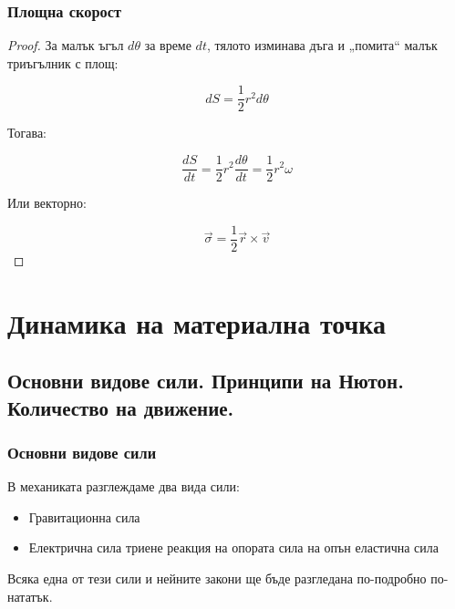 \documentclass{report}
\begin{document}
\subsection{Площна скорост}
\begin{proof}
	За малък ъгъл \( d\theta \) за време \( dt \), тялото изминава дъга и „помита“ малък триъгълник с площ:

\[
dS = \frac{1}{2} r^2 d\theta
\]

Тогава:

\[
\frac{dS}{dt} = \frac{1}{2} r^2 \frac{d\theta}{dt} = \frac{1}{2} r^2 \omega
\]

Или векторно:

\[
\vec{\sigma} = \frac{1}{2} \vec{r} \times \vec{v}
\]
\end{proof}




\chapter{Динамика на материална точка}

\section{Основни видове сили. Принципи на Нютон. Количество на движение.}
\subsection{Основни видове сили}
В механиката разглеждаме два вида сили: \begin{itemize}
    \item Гравитационна сила
    \item Електрична сила
    \subitem триене
    \subitem реакция на опората
    \subitem сила на опън
    \subitem еластична сила
\end{itemize}
Всяка една от тези сили и нейните закони ще бъде разгледана по-подробно по-нататък.
\end{document}

